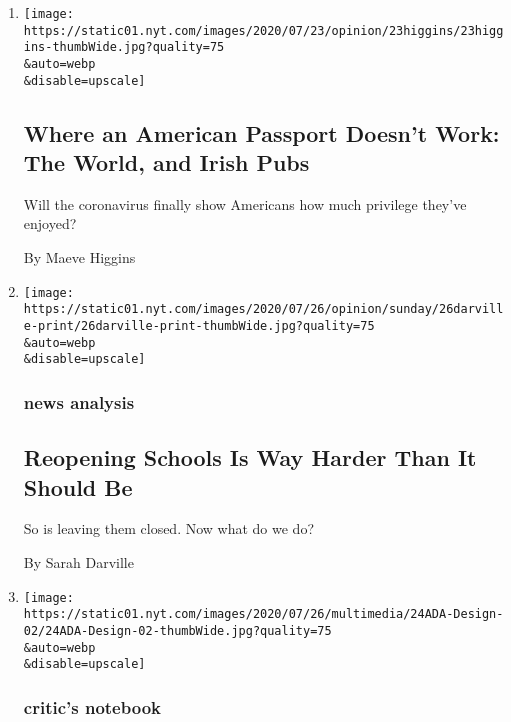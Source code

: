 \begin{enumerate}
\def\labelenumi{\arabic{enumi}.}
\item
  \href{/2020/07/23/opinion/passport-coronavirus-travel.html}{}

  \texttt{[image: https://static01.nyt.com/images/2020/07/23/opinion/23higgins/23higgins-thumbWide.jpg?quality=75\\\&auto=webp\\\&disable=upscale]}

  \hypertarget{where-an-american-passport-doesnt-work-the-world-and-irish-pubs}{%
  \subsection{Where an American Passport Doesn't Work: The World, and
  Irish
  Pubs}\label{where-an-american-passport-doesnt-work-the-world-and-irish-pubs}}

  Will the coronavirus finally show Americans how much privilege they've
  enjoyed?

  By Maeve Higgins
\item
  \href{/2020/07/23/sunday-review/reopening-schools-coronavirus.html}{}

  \texttt{[image: https://static01.nyt.com/images/2020/07/26/opinion/sunday/26darville-print/26darville-print-thumbWide.jpg?quality=75\\\&auto=webp\\\&disable=upscale]}

  \hypertarget{news-analysis}{%
  \subsubsection{news analysis}\label{news-analysis}}

  \hypertarget{reopening-schools-is-way-harder-than-it-should-be}{%
  \subsection{Reopening Schools Is Way Harder Than It Should
  Be}\label{reopening-schools-is-way-harder-than-it-should-be}}

  So is leaving them closed. Now what do we do?

  By Sarah Darville
\item
  \href{/2020/07/20/arts/disabilities-architecture-design.html}{}

  \texttt{[image: https://static01.nyt.com/images/2020/07/26/multimedia/24ADA-Design-02/24ADA-Design-02-thumbWide.jpg?quality=75\\\&auto=webp\\\&disable=upscale]}

  \hypertarget{critics-notebook}{%
  \subsubsection{critic's notebook}\label{critics-notebook}}


\end{enumerate}
